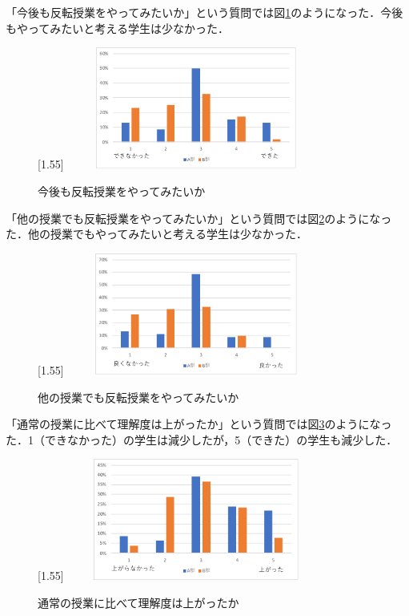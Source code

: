 \documentclass[a4j,11pt]{jsarticle}
\begin{document}
\newpage
「今後も反転授業をやってみたいか」という質問では図\ref{anke11}のようになった．今後もやってみたいと考える学生は少なかった．

\begin{figure}[h]
\begin{center}
\scalebox{1.2}[1.55]{
 \includegraphics[clip,width=85mm,height=40mm]{anke11.pdf}
 }
\end{center}
 \caption{今後も反転授業をやってみたいか}
 \label{anke11}
\end{figure}

「他の授業でも反転授業をやってみたいか」という質問では図\ref{anke12}のようになった．他の授業でもやってみたいと考える学生は少なかった．

\begin{figure}[h]
\begin{center}
\scalebox{1.2}[1.55]{
 \includegraphics[clip,width=85mm,height=40mm]{anke12.pdf}
 }
\end{center}
 \caption{他の授業でも反転授業をやってみたいか}
 \label{anke12}
\end{figure}

\newpage
「通常の授業に比べて理解度は上がったか」という質問では図\ref{anke13}のようになった．1（できなかった）の学生は減少したが，5（できた）の学生も減少した．

\begin{figure}[h]
\begin{center}
\scalebox{1.2}[1.55]{
 \includegraphics[clip,width=85mm,height=40mm]{anke13.pdf}
 }
\end{center}
 \caption{通常の授業に比べて理解度は上がったか}
 \label{anke13}
\end{figure}
\end{document}
